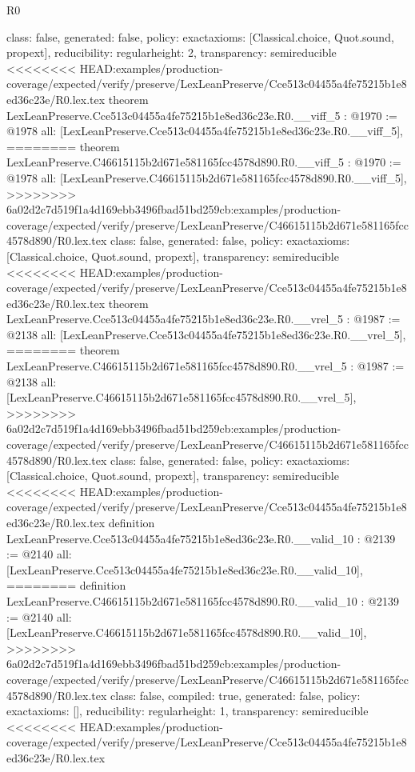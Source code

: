 \begin{lexlean}{R0}
\begin{coremodule}
{{{{{{{{{{{{{{{{{{{{{{{{{{{{{{{{{{  class: false,
  generated: false,
  policy: exact{axioms: [Classical.choice, Quot.sound, propext]},
  reducibility: regular{height: 2},
  transparency: semireducible
}
<<<<<<<< HEAD:examples/production-coverage/expected/verify/preserve/LexLeanPreserve/Cce513c04455a4fe75215b1e8ed36c23e/R0.lex.tex
theorem LexLeanPreserve.Cce513c04455a4fe75215b1e8ed36c23e.R0.__viff_5 : @1970 := @1978 {
  all: [LexLeanPreserve.Cce513c04455a4fe75215b1e8ed36c23e.R0.__viff_5],
========
theorem LexLeanPreserve.C46615115b2d671e581165fcc4578d890.R0.__viff_5 : @1970 := @1978 {
  all: [LexLeanPreserve.C46615115b2d671e581165fcc4578d890.R0.__viff_5],
>>>>>>>> 6a02d2c7d519f1a4d169ebb3496fbad51bd259cb:examples/production-coverage/expected/verify/preserve/LexLeanPreserve/C46615115b2d671e581165fcc4578d890/R0.lex.tex
  class: false,
  generated: false,
  policy: exact{axioms: [Classical.choice, Quot.sound, propext]},
  transparency: semireducible
}
<<<<<<<< HEAD:examples/production-coverage/expected/verify/preserve/LexLeanPreserve/Cce513c04455a4fe75215b1e8ed36c23e/R0.lex.tex
theorem LexLeanPreserve.Cce513c04455a4fe75215b1e8ed36c23e.R0.__vrel_5 : @1987 := @2138 {
  all: [LexLeanPreserve.Cce513c04455a4fe75215b1e8ed36c23e.R0.__vrel_5],
========
theorem LexLeanPreserve.C46615115b2d671e581165fcc4578d890.R0.__vrel_5 : @1987 := @2138 {
  all: [LexLeanPreserve.C46615115b2d671e581165fcc4578d890.R0.__vrel_5],
>>>>>>>> 6a02d2c7d519f1a4d169ebb3496fbad51bd259cb:examples/production-coverage/expected/verify/preserve/LexLeanPreserve/C46615115b2d671e581165fcc4578d890/R0.lex.tex
  class: false,
  generated: false,
  policy: exact{axioms: [Classical.choice, Quot.sound, propext]},
  transparency: semireducible
}
<<<<<<<< HEAD:examples/production-coverage/expected/verify/preserve/LexLeanPreserve/Cce513c04455a4fe75215b1e8ed36c23e/R0.lex.tex
definition LexLeanPreserve.Cce513c04455a4fe75215b1e8ed36c23e.R0.__valid_10 : @2139 := @2140 {
  all: [LexLeanPreserve.Cce513c04455a4fe75215b1e8ed36c23e.R0.__valid_10],
========
definition LexLeanPreserve.C46615115b2d671e581165fcc4578d890.R0.__valid_10 : @2139 := @2140 {
  all: [LexLeanPreserve.C46615115b2d671e581165fcc4578d890.R0.__valid_10],
>>>>>>>> 6a02d2c7d519f1a4d169ebb3496fbad51bd259cb:examples/production-coverage/expected/verify/preserve/LexLeanPreserve/C46615115b2d671e581165fcc4578d890/R0.lex.tex
  class: false,
  compiled: true,
  generated: false,
  policy: exact{axioms: []},
  reducibility: regular{height: 1},
  transparency: semireducible
}
<<<<<<<< HEAD:examples/production-coverage/expected/verify/preserve/LexLeanPreserve/Cce513c04455a4fe75215b1e8ed36c23e/R0.lex.tex
}}}}}}}}}}}}}}}}}}}}}}}}}}}}}}}}}}}}
\end{coremodule}
\end{lexlean}
